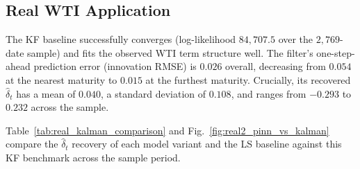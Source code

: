 \documentclass[sigconf, authorversion=true, nonacm=true]{acmart}
\begin{document}
\subsection{Real WTI Application}
\label{sec:real_data}
The KF baseline successfully converges (log-likelihood $84{,}707.5$ over the $2{,}769$-date sample) and fits the observed WTI term structure well. The filter's one-step-ahead prediction error (innovation RMSE) is $0.026$ overall, decreasing from $0.054$ at the nearest maturity to $0.015$ at the furthest maturity. Crucially, its recovered $\hat\delta_t$ has a mean of $0.040$, a standard deviation of $0.108$, and ranges from $-0.293$ to $0.232$ across the sample.

Table~\ref{tab:real_kalman_comparison} and Fig.~\ref{fig:real2_pinn_vs_kalman} compare the $\hat{\delta}_t$ recovery of each model variant and the LS baseline against this KF benchmark across the sample period.

\begin{table}[tp]
\centering
\caption{Recovered $\hat\delta_t$ against the KF benchmark on real
WTI, common dates (2015-01-05 to 2026-02-19). Correlation/RMSE are against the
KF-filtered path; range/mean/std describe each method's own recovered
series in isolation.}
\label{tab:real_kalman_comparison}
\end{table}
\end{document}
